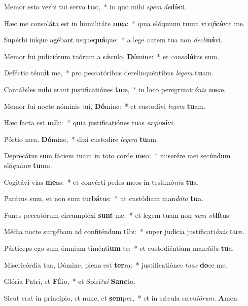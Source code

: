 ﻿\item Memor esto verbi tui servo \textbf{tu}o,~* in quo mihi \emph{spem} \emph{de}\textbf{dís}ti.
\item Hæc me consoláta est in humilitáte \textbf{me}a:~* quia elóquium tuum vi\emph{vi}\emph{fi}\textbf{cá}vit me.
\item Supérbi iníque agébant usque\textbf{quá}que:~* a lege autem tua non \emph{de}\emph{cli}\textbf{ná}vi.
\item Memor fui judiciórum tuórum a sǽculo, \textbf{Dó}mine:~* et \emph{con}\emph{so}\textbf{lá}tus sum.
\item Deféctio ténu\textbf{it} me,~* pro peccatóribus derelinquéntibus \emph{le}\emph{gem} \textbf{tu}am.
\item Cantábiles mihi erant justificatiónes \textbf{tu}æ,~* in loco peregrinati\emph{ó}\emph{nis} \textbf{me}æ.
\item Memor fui nocte nóminis tui, \textbf{Dó}mine:~* et custodívi \emph{le}\emph{gem} \textbf{tu}am.
\item Hæc facta est \textbf{mi}hi:~* quia justificatiónes tuas \emph{ex}\emph{qui}\textbf{sí}vi.
\item Pórtio mea, \textbf{Dó}mine,~* dixi custodíre \emph{le}\emph{gem} \textbf{tu}am.
\item Deprecátus sum fáciem tuam in toto corde \textbf{me}o:~* miserére mei secúndum eló\emph{qui}\emph{um} \textbf{tu}um.
\item Cogitávi vias \textbf{me}as:~* et convérti pedes meos in testimó\emph{ni}\emph{a} \textbf{tu}a.
\item Parátus sum, et non sum tur\textbf{bá}tus:~* ut custódiam man\emph{dá}\emph{ta} \textbf{tu}a.
\item Funes peccatórum circumpléxi \textbf{sunt} me:~* et legem tuam non \emph{sum} \emph{ob}\textbf{lí}tus.
\item Média nocte surgébam ad confiténdum \textbf{ti}bi:~* super judícia justificati\emph{ó}\emph{nis} \textbf{tu}æ.
\item Párticeps ego sum ómnium timénti\textbf{um} te:~* et custodiéntium man\emph{dá}\emph{ta} \textbf{tu}a.
\item Misericórdia tua, Dómine, plena est \textbf{ter}ra:~* justificatiónes \emph{tu}\emph{as} \textbf{do}ce me.
\item Glória Patri, et \textbf{Fí}lio,~* et Spirí\emph{tu}\emph{i} \textbf{Sanc}to.
\item Sicut erat in princípio, et nunc, et \textbf{sem}per,~* et in sǽcula sæcu\emph{ló}\emph{rum}. \textbf{A}men.